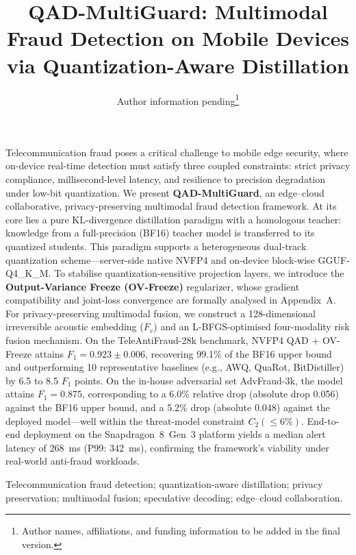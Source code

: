 \documentclass[11pt, a4paper]{article}
\title{\textbf{QAD-MultiGuard: Multimodal Fraud Detection on Mobile Devices via Quantization-Aware Distillation}}
\author{Author information pending\thanks{Author names, affiliations, and funding information to be added in the final version.}}
\date{}
\begin{document}
\maketitle
\thispagestyle{plain}

Telecommunication fraud poses a critical challenge to mobile edge security, where on-device real-time detection must satisfy three coupled constraints: strict privacy compliance, millisecond-level latency, and resilience to precision degradation under low-bit quantization. We present \textbf{QAD-MultiGuard}, an edge--cloud collaborative, privacy-preserving multimodal fraud detection framework. At its core lies a pure KL-divergence distillation paradigm with a homologous teacher: knowledge from a full-precision (BF16) teacher model is transferred to its quantized students. This paradigm supports a heterogeneous dual-track quantization scheme---server-side native NVFP4 and on-device block-wise GGUF-Q4\_K\_M. To stabilise quantization-sensitive projection layers, we introduce the \textbf{Output-Variance Freeze (OV-Freeze)} regularizer, whose gradient compatibility and joint-loss convergence are formally analysed in Appendix~A. For privacy-preserving multimodal fusion, we construct a 128-dimensional irreversible acoustic embedding ($F_v$) and an L-BFGS-optimised four-modality risk fusion mechanism. On the TeleAntiFraud-28k benchmark, NVFP4 QAD + OV-Freeze attains $F_1 = 0.923 \pm 0.006$, recovering 99.1\% of the BF16 upper bound and outperforming 10 representative baselines (e.g., AWQ, QuaRot, BitDistiller) by 6.5 to 8.5 $F_1$ points. On the in-house adversarial set AdvFraud-3k, the model attains $F_1 = 0.875$, corresponding to a 6.0\% relative drop (absolute drop 0.056) against the BF16 upper bound, and a 5.2\% drop (absolute 0.048) against the deployed model---well within the threat-model constraint $C_2(\le 6\%)$. End-to-end deployment on the Snapdragon~8~Gen~3 platform yields a median alert latency of 268~ms (P99: 342~ms), confirming the framework's viability under real-world anti-fraud workloads.

\vspace{0.5em}
 Telecommunication fraud detection; quantization-aware distillation; privacy preservation; multimodal fusion; speculative decoding; edge--cloud collaboration.

\end{document}
